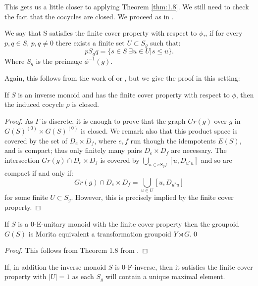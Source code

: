 This gets us a little closer to applying Theorem \ref{thm:1.8}. We still need to check the fact that the cocycles are closed. We proceed as in \cite{MR1900993}.

\begin{definition}
We say that S satisfies the finite cover property with respect to $\phi$,, if for every $p,q \in S$, $p,q\not = 0$ there exists a finite set $U \subset S_{g}$ such that:
\begin{equation*}
pS_{g}q=\lbrace s \in S | \exists u \in U | s \leq u \rbrace.
\end{equation*}
Where $S_{g}$ is the preimage $\phi^{-1}(g)$.
\end{definition}

Again, this follows from the work of \cite{Milan-Steinberg} or \cite{MR1900993}, but we give the proof in this setting:

\begin{lemma}
If $S$ is an inverse monoid and has the finite cover property with respect to $\phi$, then the induced cocycle $\rho$ is closed.
\end{lemma}
\begin{proof}
As $\Gamma$ is discrete, it is enough to prove that the graph $Gr(g)$ over $g$ in $G(S)^{(0)}\times G(S)^{(0)}$ is closed. We remark also that this product space is covered by the set of $D_{e} \times D_{f}$, where $e,f$ run though the idempotents $E(S)$, and is compact; thus only finitely many pairs $D_{e}\times D_{f}$ are necessary. The intersection $Gr(g) \cap D_{e}\times D_{f}$ is covered by $\bigcup_{u \in eS_{g}f} [u,D_{u^{*}u}]$ and so are compact if and only if:
\begin{equation*}
Gr(g) \cap D_{e}\times D_{f} = \bigcup_{u \in U}[u,D_{u^{*}u}]
\end{equation*}
for some finite $U \subset S_{g}$. However, this is precisely implied by the finite cover property.
\end{proof}

\begin{corollary}\label{Thm:Trick}
If $S$ is a 0-E-unitary monoid with the finite cover property then the groupoid $G(S)$ is Morita equivalent a transformation groupoid $Y \rtimes G$.\qed
\end{corollary}
\begin{proof}
This follows from Theorem 1.8 from \cite{MR1900993}.
\end{proof}

\begin{remark}
If, in addition the inverse monoid $S$ is 0-F-inverse, then it satisfies the finite cover property with $\vert U \vert=1$ as each $S_{g}$ will contain a unique maximal element.
\end{remark}

